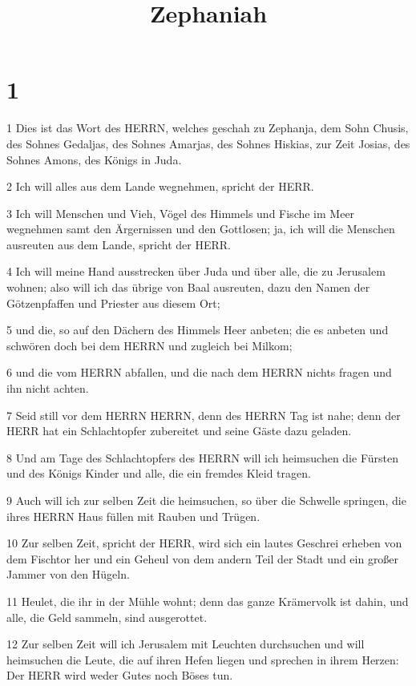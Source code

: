 

\title{Zephaniah}


\chapter{1}

\par 1 Dies ist das Wort des HERRN, welches geschah zu Zephanja, dem Sohn Chusis, des Sohnes Gedaljas, des Sohnes Amarjas, des Sohnes Hiskias, zur Zeit Josias, des Sohnes Amons, des Königs in Juda.
\par 2 Ich will alles aus dem Lande wegnehmen, spricht der HERR.
\par 3 Ich will Menschen und Vieh, Vögel des Himmels und Fische im Meer wegnehmen samt den Ärgernissen und den Gottlosen; ja, ich will die Menschen ausreuten aus dem Lande, spricht der HERR.
\par 4 Ich will meine Hand ausstrecken über Juda und über alle, die zu Jerusalem wohnen; also will ich das übrige von Baal ausreuten, dazu den Namen der Götzenpfaffen und Priester aus diesem Ort;
\par 5 und die, so auf den Dächern des Himmels Heer anbeten; die es anbeten und schwören doch bei dem HERRN und zugleich bei Milkom;
\par 6 und die vom HERRN abfallen, und die nach dem HERRN nichts fragen und ihn nicht achten.
\par 7 Seid still vor dem HERRN HERRN, denn des HERRN Tag ist nahe; denn der HERR hat ein Schlachtopfer zubereitet und seine Gäste dazu geladen.
\par 8 Und am Tage des Schlachtopfers des HERRN will ich heimsuchen die Fürsten und des Königs Kinder und alle, die ein fremdes Kleid tragen.
\par 9 Auch will ich zur selben Zeit die heimsuchen, so über die Schwelle springen, die ihres HERRN Haus füllen mit Rauben und Trügen.
\par 10 Zur selben Zeit, spricht der HERR, wird sich ein lautes Geschrei erheben von dem Fischtor her und ein Geheul von dem andern Teil der Stadt und ein großer Jammer von den Hügeln.
\par 11 Heulet, die ihr in der Mühle wohnt; denn das ganze Krämervolk ist dahin, und alle, die Geld sammeln, sind ausgerottet.
\par 12 Zur selben Zeit will ich Jerusalem mit Leuchten durchsuchen und will heimsuchen die Leute, die auf ihren Hefen liegen und sprechen in ihrem Herzen: Der HERR wird weder Gutes noch Böses tun.
